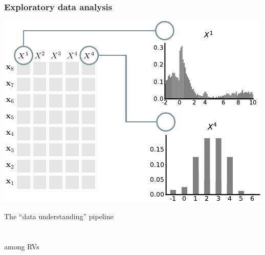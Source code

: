 \documentclass[xcolor={usenames,dvipsnames,svgnames}, compress, aspectratio=169, 11pt]{beamer}
\begin{document}
\begin{frame}[t, htt=bgrey2]
  \frametitle{Exploratory data analysis}

  \large
  \begin{minipage}[t]{0.6\linewidth}
    \includegraphics[width=.99\linewidth]{figures/abda-hist-type}
  \end{minipage}\hfill\begin{minipage}[t]{0.4\linewidth}
    \vspace{-150pt}
    {The ``data understanding'' pipeline}\\[5pt]
    \\
    \\
     among
    RVs\\
    \\
  \end{minipage}  
\end{frame}
\end{document}

